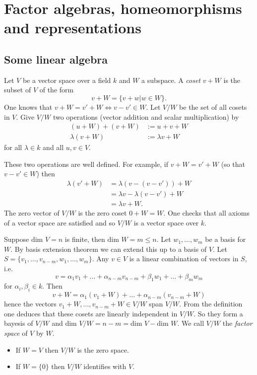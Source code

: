 \section{Factor algebras, homeomorphisms and representations}

\subsection{Some linear algebra}
Let $V$ be a vector space over a field $k$ and $W$ a subspace. A \emph{coset} $v + W$ is the subset of $V$ of the form
\[
  v + W = \{ v + w | w \in W \}.
\]
One knows that $v + W = v' + W \iff v - v' \in W$. Let $V/W$ be the set of all cosets in $V$. Give $V/W$ two operations (vector addition and scalar multiplication) by
\begin{align*}
  (u + W) + (v + W) &:= u + v + W\\
     \lambda(v + W) &:= \lambda v + W
\end{align*}
for all $\lambda \in k$ and all $u, v \in V$.

These two operations are well defined. For example, if $v + W = v' + W$ (so that $v - v' \in W$) then
\begin{align*}
  \lambda(v' + W) &= \lambda(v - (v - v')) + W\\
                  &= \lambda v - \lambda(v - v') + W\\
                  &= \lambda v + W.
\end{align*}
The zero vector of $V/W$ is the zero coset $0 + W = W$. One checks that all axioms of a vector space are satisfied and so $V/W$ is a vector space over $k$.

Suppose $\text{dim } V = n$ is finite, then $\text{dim } W = m \leq n$. Let $w_1, \dots, w_m$ be a basis for $W$. By basis extension theorem we can extend this up to a basis of $V$. Let $S = \{ v_1, \dots, v_{n-m}, w_1, \dots, w_m \}$. Any $v \in V$ is a linear combination of vectors in $S$, i.e.
\[
  v = \alpha_1 v_1 + \dots + \alpha_{n-m} v_{n-m} + \beta_1 w_1 + \dots + \beta_m w_m
\]
for $\alpha_i, \beta_i \in k$. Then
\[
  v + W = \alpha_1 (v_1 + W) + \dots + \alpha_{n-m} (v_{n-m} + W)
\]
hence the vectors $v_1 + W, \dots, v_{n-m} + W \in V/W$ span $V/W$. From the definition one deduces that these cosets are linearly independent in $V/W$. So they form a bayesis of $V/W$ and $\text{dim } V/W = n - m = \text{dim } V - \text{dim } W$. We call $V/W$ the \emph{factor space} of $V$ by $W$.

\begin{remark}
  \begin{itemize}
    \item If $W = V$ then $V/W$ is the zero space.
    \item If $W = \{ 0 \}$ then $V/W$ identifies with $V$.
  \end{itemize}
\end{remark}

